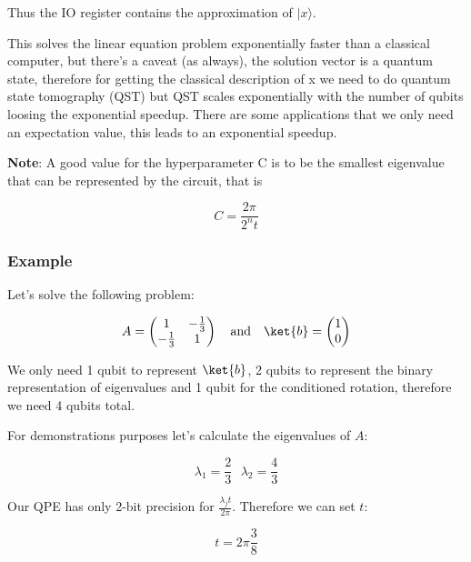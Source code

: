 Thus the IO register contains the approximation of $|x \rangle$.

This solves the linear equation problem exponentially faster than a classical computer, but there's a caveat (as always), the solution vector is a quantum state, therefore for getting the classical description of x we need to do quantum state tomography (QST) but QST scales exponentially with the number of qubits loosing the exponential speedup. There are some applications that we only need an expectation value, this leads to an exponential speedup.

\textbf{Note}: A good value for the hyperparameter C is to be the smallest eigenvalue that can be represented by the circuit, that is 

$$
C = \frac{2 \pi}{2^n t}
$$

\subsubsection{Example}
\label{Subsubsec: Example HHL}

Let's solve the following problem:

\begin{equation*}
    A = \begin{pmatrix}
    1 & - \frac{1}{3} \\
    - \frac{1}{3} & 1
    \end{pmatrix} \ \ \ \text{and} \ \ \ \ket{b} = \begin{pmatrix}
    1 \\ 
    0
    \end{pmatrix}
\end{equation*}

We only need 1 qubit to represent $\ket{b}$, 2 qubits to represent the binary representation of eigenvalues and 1 qubit for the conditioned rotation, therefore we need 4 qubits total.

For demonstrations purposes let's calculate the eigenvalues of $A$:

\begin{equation*}
    \lambda_1 = \frac{2}{3} \ \ \ \lambda_2 = \frac{4}{3}
\end{equation*}

Our QPE has only 2-bit precision for $\frac{\lambda_j t}{2 \pi}$. Therefore we can set $t$:

\begin{equation*}
    t = 2 \pi \frac{3}{8}
\end{equation*}

